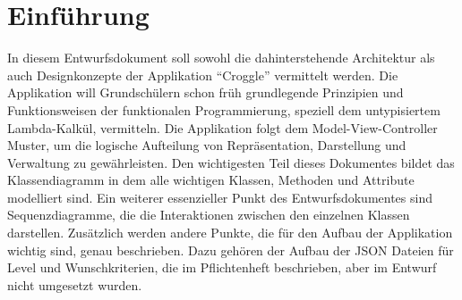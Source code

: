 \chapter{Einführung}

In diesem Entwurfsdokument soll sowohl die dahinterstehende Architektur als auch Designkonzepte der Applikation "`Croggle"' vermittelt werden.
Die Applikation will Grundschülern schon früh grundlegende Prinzipien und Funktionsweisen der funktionalen Programmierung, speziell dem untypisiertem Lambda-Kalkül, vermitteln.
Die Applikation folgt dem Model-View-Controller Muster, um die logische Aufteilung von Repräsentation, Darstellung und Verwaltung zu gewährleisten.
Den wichtigesten Teil dieses Dokumentes bildet das Klassendiagramm in dem alle wichtigen Klassen, Methoden und Attribute modelliert sind.
Ein weiterer essenzieller Punkt des Entwurfsdokumentes sind Sequenzdiagramme, die die Interaktionen zwischen den einzelnen Klassen darstellen.
Zusätzlich werden andere Punkte, die für den Aufbau der Applikation wichtig sind, genau beschrieben. Dazu gehören der Aufbau der JSON Dateien für Level und Wunschkriterien, die im Pflichtenheft beschrieben, aber im Entwurf nicht umgesetzt wurden.
